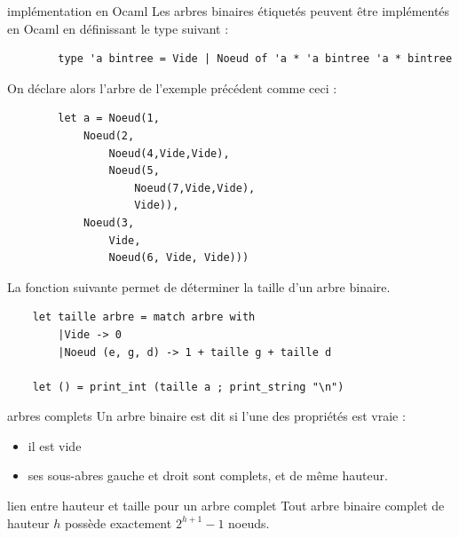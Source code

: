 \begin{exemple}{7.8}{implémentation en Ocaml}
    Les arbres binaires étiquetés peuvent être implémentés en Ocaml en définissant le type suivant :
    \begin{verbatim}
        type 'a bintree = Vide | Noeud of 'a * 'a bintree 'a * bintree
    \end{verbatim}
    On déclare alors l'arbre de l'exemple précédent comme ceci : 
    \begin{verbatim}
        let a = Noeud(1,
            Noeud(2,
                Noeud(4,Vide,Vide),
                Noeud(5,
                    Noeud(7,Vide,Vide),
                    Vide)),
            Noeud(3,
                Vide,
                Noeud(6, Vide, Vide)))
    \end{verbatim}
    La fonction suivante permet de déterminer la taille d'un arbre binaire.
    \begin{verbatim}
    let taille arbre = match arbre with
        |Vide -> 0
        |Noeud (e, g, d) -> 1 + taille g + taille d

    let () = print_int (taille a ; print_string "\n")
    \end{verbatim}
\end{exemple}

\begin{definition}{7.9}{arbres complets}
    Un arbre binaire est dit  si l'une des propriétés est vraie : \begin{itemize}
        \item il est vide
        \item ses sous-abres gauche et droit sont complets, et de même hauteur.
    \end{itemize}
    
\end{definition}

\begin{proposition}{7.10}{lien entre hauteur et taille pour un arbre complet}
    Tout arbre binaire complet de hauteur $h$ possède exactement $2^{h+1} - 1$ noeuds.
\end{proposition}

